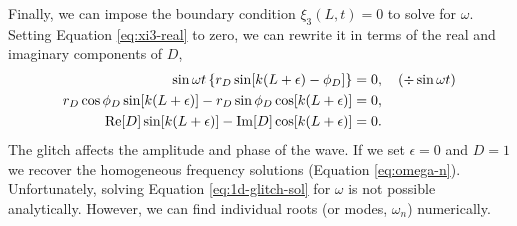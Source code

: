 Finally, we can impose the boundary condition \(\xi_3(L, t) = 0\) to solve for \(\omega\). Setting Equation \ref{eq:xi3-real} to zero, we can rewrite it in terms of the real and imaginary components of \(D\),
%
\begin{align}
    \sin \omega t \left\{r_D \sin[k(L + \epsilon) - \phi_D]\right\} &= 0, \quad (\div \sin \omega t) \notag \\
    r_D \cos \phi_D \sin[k(L + \epsilon)] - r_D \sin \phi_D \cos[k(L + \epsilon)] &= 0, \notag \\
    {\mathrm{Re}}[D] \sin[k(L + \epsilon)] - {\mathrm{Im}}[D] \cos[k(L + \epsilon)] &=0. \label{eq:1d-glitch-sol}
\end{align}
%
The glitch affects the amplitude and phase of the wave. If we set \(\epsilon = 0\) and \(D = 1\) we recover the homogeneous frequency solutions (Equation \ref{eq:omega-n}). Unfortunately, solving Equation \ref{eq:1d-glitch-sol} for \(\omega\) is not possible analytically. However, we can find individual roots (or modes, \(\omega_n\)) numerically.

